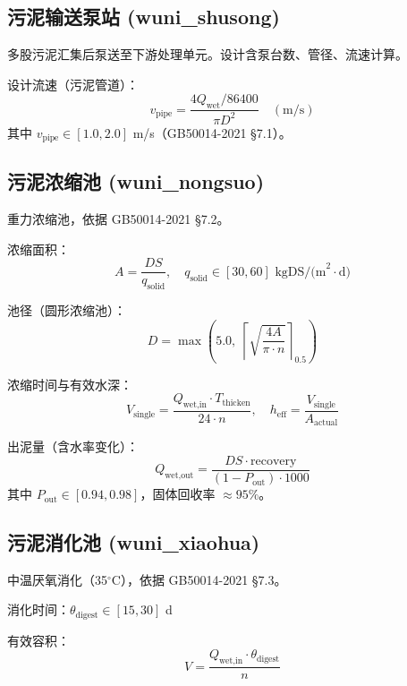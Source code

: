 \documentclass[12pt,a4paper]{ctexart}
\begin{document}
\subsection{污泥输送泵站 (wuni\_shusong)}
多股污泥汇集后泵送至下游处理单元。设计含泵台数、管径、流速计算。

设计流速（污泥管道）：
\begin{equation}
v_{\text{pipe}} = \frac{4 Q_{\text{wet}} / 86400}{\pi D^2} \quad (\text{m/s})
\end{equation}
其中 $v_{\text{pipe}} \in [1.0, 2.0]$ m/s（GB50014-2021 §7.1）。

\subsection{污泥浓缩池 (wuni\_nongsuo)}
重力浓缩池，依据 GB50014-2021 §7.2。

浓缩面积：
\begin{equation}
A = \frac{DS}{q_{\text{solid}}}, \quad q_{\text{solid}} \in [30, 60] \text{ kgDS/(m}^2\cdot\text{d)}
\end{equation}

池径（圆形浓缩池）：
\begin{equation}
D = \max\left(5.0,\; \left\lceil \sqrt{\frac{4A}{\pi \cdot n}} \right\rceil_{0.5}\right)
\end{equation}

浓缩时间与有效水深：
\begin{equation}
V_{\text{single}} = \frac{Q_{\text{wet,in}} \cdot T_{\text{thicken}}}{24 \cdot n}, \quad
h_{\text{eff}} = \frac{V_{\text{single}}}{A_{\text{actual}}}
\end{equation}

出泥量（含水率变化）：
\begin{equation}
Q_{\text{wet,out}} = \frac{DS \cdot \text{recovery}}{(1 - P_{\text{out}}) \cdot 1000}
\end{equation}
其中 $P_{\text{out}} \in [0.94, 0.98]$，固体回收率 $\approx 95\%$。

\subsection{污泥消化池 (wuni\_xiaohua)}
中温厌氧消化（35$^\circ$C），依据 GB50014-2021 §7.3。

消化时间：$\theta_{\text{digest}} \in [15, 30]$ d

有效容积：
\begin{equation}
V = \frac{Q_{\text{wet,in}} \cdot \theta_{\text{digest}}}{n}
\end{equation}
\end{document}
